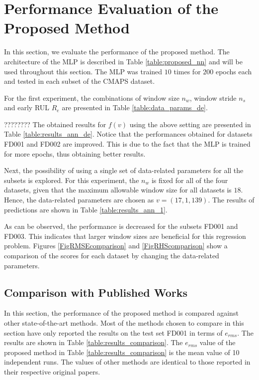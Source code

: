\documentclass[12pt]{IEEEtran}%
\begin{document}
\section{Performance Evaluation of the Proposed Method}

\label{sec:rul_eval}

In this section, we evaluate the performance of the proposed method. The
architecture of the MLP is described in Table \ref{table:proposed_nn} and will
be used throughout this section. The MLP was trained $10$ times for $200$
epochs each and tested in each subset of the CMAPS dataset.

For the first experiment, the combinations of window size $n_{w}$, window
stride $n_{s}$ and early RUL $R_{e}$ are presented in Table
\ref{table:data_params_de}.

????????
The obtained results for $f(v)$ using the above setting are presented in Table
\ref{table:results_ann_de}. Notice that the performances obtained for datasets
FD001 and FD002 are improved. This is due to the fact that the MLP is trained
for more epochs, thus obtaining better results.

Next, the possibility of using a single set of data-related parameters for all
the subsets is explored. For this experiment, the $n_{w}$ is fixed for all of
the four datasets, given that the maximum allowable window size for all
datasets is $18$. Hence, the data-related parameters are chosen as $v=(17, 1,
139)$. The results of predictions are shown in Table \ref{table:results_ann_1}.

As can be observed, the performance is decreased for the subsets FD001 and
FD003. This indicates that larger window sizes are beneficial for this
regression problem. Figures \ref{FigRMSEcomparison} and \ref{FigRHScomparison}
show a comparison of the scores for each dataset by changing the data-related
parameters.

\subsection{Comparison with Published Works}

In this section, the performance of the proposed method is compared against
other state-of-the-art methods. Most of the methods chosen to compare in this
section have only reported the results on the test set FD001 in terms of
$e_{rms}$. The results are shown in Table \ref{table:results_comparison}. The
$e_{rms}$ value of the proposed method in Table \ref{table:results_comparison}
is the mean value of 10 independent runs. The values of other methods are
identical to those reported in their respective original papers.
\end{document}
